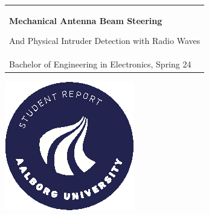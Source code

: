 %
\begin{titlepage}
\vspace*{\fill}
  \noindent%
  {\color{white}\colorbox{aaublue}{\begin{tabular}{@{}p{\textwidth}@{}}
    \begin{center}
    \Huge{\textbf{
      Mechanical Antenna Beam Steering%
    }}
    \end{center}
    \begin{center}
      \Large{
        And Physical Intruder Detection with Radio Waves%
      }
    \end{center}
    \vspace{0.2cm}
   \begin{center}
    {\Large
      Rikke Udengaard%
    }\\
    \vspace{0.2cm}
    {\large
      Bachelor of Engineering in Electronics, Spring 24%
    }
   \end{center}
   \vspace{0.2cm}
   \begin{center}
    {\Large
      Fifth Semester Project
    }
   \end{center}
  \end{tabular}}}
  \vfill
  \begin{center}
    \includegraphics[width=0.2\paperwidth]{images/aau_logo_circle_en.eps}%
  \end{center}
\end{titlepage}
\clearpage
{}